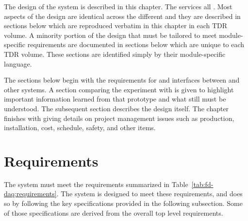 The design of the    system is described in this chapter.  The  services all  .  Most  aspects of the design are identical across the different  and they are described in sections below which are reproduced verbatim in this  chapter in each  TDR volume.  A minority portion of the  design that must be tailored to meet module-specific requirements are documented in sections below which are unique to each  TDR volume.  These sections are identified simply by their module-specific language.

The sections below begin with the requirements for and interfaces between  and other  systems.  A section comparing the  experiment with  is given to highlight important information learned from that prototype and what still must be understood.  The subsequent section describes the design itself.  The chapter finishes with giving details on project management issues such as production, installation, cost, schedule, safety, and other items.

\section{Requirements}
\label{sec:fd-daq:requirements}


The    system must meet the requirements 
summarized in Table~\ref{tab:fd-daq:requirements}. The system is
designed to meet these requirements, and does so by following the key
specifications provided in the following subsection. Some of those
specifications are derived from the overall   top level requirements.


